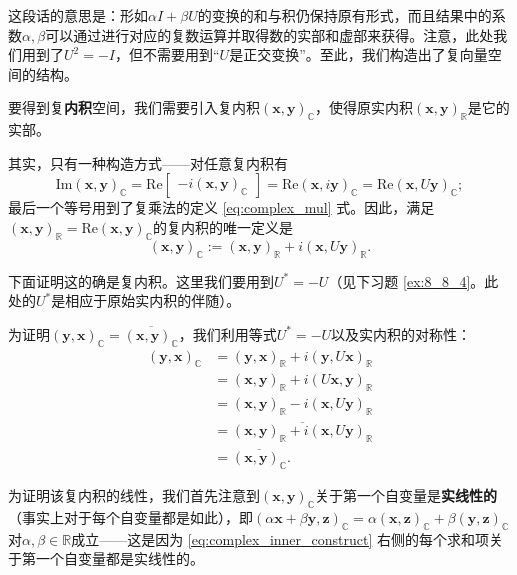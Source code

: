 这段话的意思是：形如$\alpha I+\beta U$的变换的和与积仍保持原有形式，而且结果中的系数$\alpha,\beta$可以通过进行对应的复数运算并取得数的实部和虚部来获得。注意，此处我们用到了$U^2=-I$，但不需要用到“$U$是正交变换”。至此，我们构造出了复向量空间的结构。

要得到复\textbf{内积}空间，我们需要引入复内积$ (\mathbf{x},\mathbf{y})_\mathbb{C}$，使得原实内积$ (\mathbf{x},\mathbf{y})_\mathbb{R}$是它的实部。

其实，只有一种构造方式——对任意复内积有
\[\mathrm{Im}(\mathbf{x},\mathbf{y})_{\mathbb{C}}=\mathrm{Re}\begin{bmatrix}-i(\mathbf{x},\mathbf{y})_{\mathbb{C}}\end{bmatrix}=\mathrm{Re}(\mathbf{x},i\mathbf{y})_{\mathbb{C}}=\mathrm{Re}(\mathbf{x},U\mathbf{y})_{\mathbb{C}};\]
最后一个等号用到了复乘法的定义 \eqref{eq:complex_mul} 式。因此，满足$ (\mathbf{x},\mathbf{y})_\mathbb{R}=\mathrm{Re}(\mathbf{x},\mathbf{y})_\mathbb{C}$的复内积的唯一定义是
\begin{equation}\label{eq:complex_inner_construct}
    (\mathbf{x},\mathbf{y})_\mathbb{C}:=(\mathbf{x},\mathbf{y})_\mathbb{R} + i(\mathbf{x},U\mathbf{y})_\mathbb{R}.
\end{equation}

下面证明这的确是复内积。这里我们要用到$U^* = -U$（见下习题 \ref{ex:8_8_4}。此处的$U^*$是相应于原始实内积的伴随）。

为证明$(\mathbf{y},\mathbf{x})_{\mathbb{C}} = \overline{\left(\mathbf{x},\mathbf{y}\right)_{\mathbb{C}}}$，我们利用等式$U^* = -U$以及实内积的对称性：
\pagebreak
\[
\begin{aligned}(\mathbf{y},\mathbf{x})_{\mathbb{C}}&=(\mathbf{y},\mathbf{x})_{\mathbb{R}}+i(\mathbf{y},U\mathbf{x})_{\mathbb{R}}\\&=(\mathbf{x},\mathbf{y})_{\mathbb{R}}+i(U\mathbf{x},\mathbf{y})_{\mathbb{R}}\\&=\left(\mathbf{x},\mathbf{y}\right)_{\mathbb{R}}-i(\mathbf{x},U\mathbf{y})_{\mathbb{R}}\\&=\overline{(\mathbf{x},\mathbf{y})_{\mathbb{R}}+i(\mathbf{x},U\mathbf{y})_{\mathbb{R}}}\\&=\overline{\left(\mathbf{x},\mathbf{y}\right)_{\mathbb{C}}}.\end{aligned}
\]

为证明该复内积的线性，我们首先注意到$(\mathbf{x},\mathbf{y})_{\mathbb{C}}$关于第一个自变量是\textbf{实线性的}（事实上对于每个自变量都是如此），即$\left(\alpha\mathbf{x}+\beta\mathbf{y},\mathbf{z}\right)_{\mathbb{C}}=\alpha(\mathbf{x},\mathbf{z})_{\mathbb{C}}+\beta(\mathbf{y},\mathbf{z})_{\mathbb{C}}$对$\alpha,\beta\in\mathbb{R}$成立——这是因为 \eqref{eq:complex_inner_construct} 右侧的每个求和项关于第一个自变量都是实线性的。

